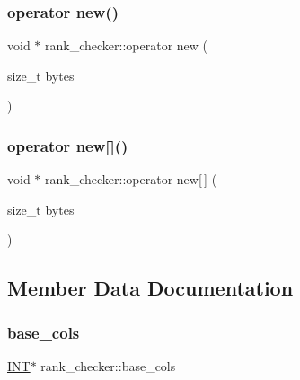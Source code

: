 \mbox{\label{classrank__checker_aa762828c0e99fba787d1c67f40e9cb66}} 
\subsubsection{\texorpdfstring{operator new()}{operator new()}}
{\footnotesize\ttfamily void $\ast$ rank\+\_\+checker\+::operator new (\begin{DoxyParamCaption}\item[{size\+\_\+t}]{bytes }\end{DoxyParamCaption})}

\mbox{\label{classrank__checker_a7045b968cbee8c76a301052812c8f60e}} 
\subsubsection{\texorpdfstring{operator new[]()}{operator new[]()}}
{\footnotesize\ttfamily void $\ast$ rank\+\_\+checker\+::operator new\mbox{[}$\,$\mbox{]} (\begin{DoxyParamCaption}\item[{size\+\_\+t}]{bytes }\end{DoxyParamCaption})}



\subsection{Member Data Documentation}
\mbox{\label{classrank__checker_aa53343a0d2862dfbbc41de8952d7bc81}} 
\subsubsection{\texorpdfstring{base\+\_\+cols}{base\_cols}}
{\footnotesize\ttfamily \mbox{\hyperlink{galois_8h_a09fddde158a3a20bd2dcadb609de11dc}{I\+NT}}$\ast$ rank\+\_\+checker\+::base\+\_\+cols}

